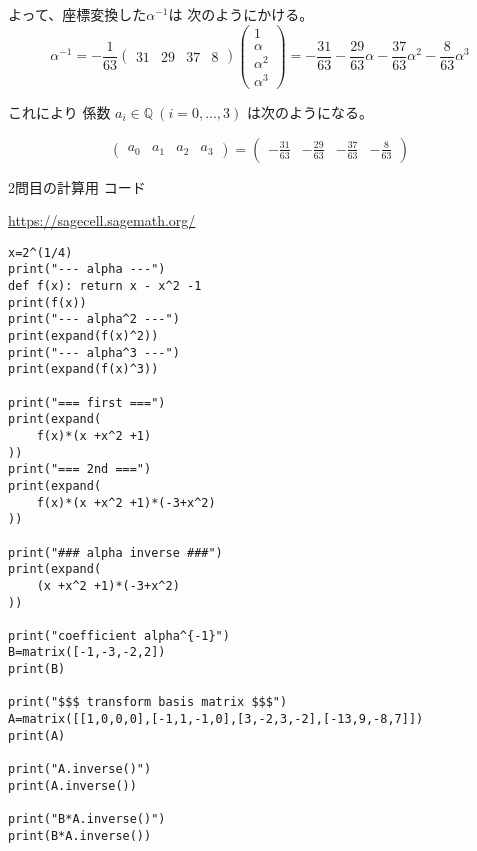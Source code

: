 \documentclass[12pt,b5paper]{ltjsarticle}
\begin{document}
\begin{enumerate}
      よって、座標変換した$\alpha^{-1}$は
      次のようにかける。
      \begin{equation}
       \alpha^{-1}
        =
       -\frac{1}{63}
       \begin{pmatrix}
        31 & 29 & 37 & 8
       \end{pmatrix}
       \begin{pmatrix}
        1 \\ \alpha \\ \alpha^{2} \\ \alpha^{3}
       \end{pmatrix}
       =
       -\frac{31}{63}
       -\frac{29}{63}\alpha
       -\frac{37}{63}\alpha^{2}
       -\frac{8}{63}\alpha^{3}
      \end{equation}

      これにより
      係数
      $a_{i}\in\mathbb{Q} \: (i=0,\dots,3)$
      は次のようになる。

      \begin{equation}
       \begin{pmatrix}
        a_{0} & a_{1} & a_{2} & a_{3}
       \end{pmatrix}
       =
       \begin{pmatrix}
        -\frac{31}{63} & -\frac{29}{63} & -\frac{37}{63} & -\frac{8}{63}
       \end{pmatrix}
      \end{equation}



      \hrulefill

\end{enumerate}

\hrulefill

2問目の計算用 コード

\url{https://sagecell.sagemath.org/}
\begin{lstlisting}
x=2^(1/4)
print("--- alpha ---")
def f(x): return x - x^2 -1
print(f(x))
print("--- alpha^2 ---")
print(expand(f(x)^2))
print("--- alpha^3 ---")
print(expand(f(x)^3))

print("=== first ===")
print(expand(
    f(x)*(x +x^2 +1)
))
print("=== 2nd ===")
print(expand(
    f(x)*(x +x^2 +1)*(-3+x^2)
))

print("### alpha inverse ###")
print(expand(
    (x +x^2 +1)*(-3+x^2)
))

print("coefficient alpha^{-1}")
B=matrix([-1,-3,-2,2])
print(B)

print("$$$ transform basis matrix $$$")
A=matrix([[1,0,0,0],[-1,1,-1,0],[3,-2,3,-2],[-13,9,-8,7]])
print(A)

print("A.inverse()")
print(A.inverse())

print("B*A.inverse()")
print(B*A.inverse())
\end{lstlisting}
\end{document}
